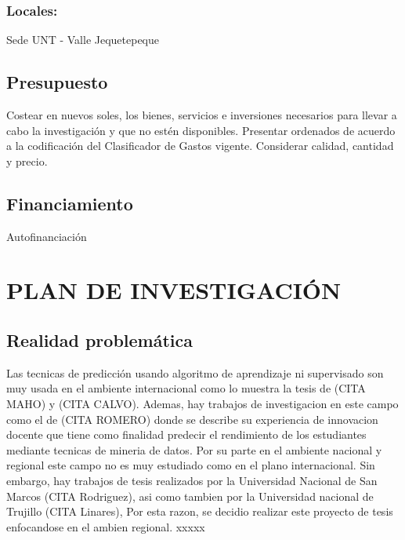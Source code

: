 \documentclass[a4paper, 12pt]{article}
\begin{document}
\subsubsection{{\bf Locales:}} Sede UNT - Valle Jequetepeque

\subsection{Presupuesto}
Costear en nuevos soles, los bienes, servicios e inversiones necesarios para llevar a cabo la investigación y que no estén disponibles. Presentar ordenados de acuerdo a la codificación del  Clasificador de Gastos vigente. Considerar calidad, cantidad y  precio.

\subsection{Financiamiento}
Autofinanciación




\section{PLAN DE INVESTIGACIÓN}


\subsection{Realidad problemática}
Las tecnicas de predicción usando algoritmo de aprendizaje ni supervisado son muy usada en el ambiente internacional como lo muestra la tesis de (CITA MAHO) y (CITA CALVO). Ademas, hay trabajos de investigacion en este campo como el de (CITA ROMERO) donde se describe su experiencia de innovacion docente que tiene como finalidad predecir el rendimiento de los estudiantes mediante tecnicas de mineria de datos. Por su parte en el ambiente nacional y regional este campo no es muy estudiado como en el plano internacional. Sin embargo, hay trabajos de tesis realizados por la Universidad Nacional de San Marcos (CITA Rodriguez), asi como tambien por la Universidad nacional de Trujillo (CITA Linares), Por esta razon, se decidio realizar este proyecto de tesis enfocandose en el ambien regional.
\skip 0.2cm
xxxxx 
\end{document}
